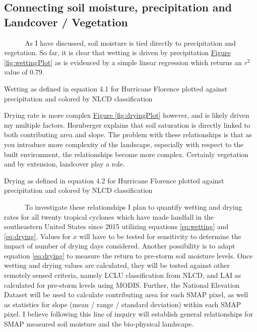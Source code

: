 \documentclass[
]{book}
\begin{document}
\hypertarget{connecting-soil-moisture-precipitation-and-landcover-vegetation}{%
\subsection{Connecting soil moisture, precipitation and Landcover / Vegetation}\label{connecting-soil-moisture-precipitation-and-landcover-vegetation}}

~~~~~~As I have discussed, soil moisture is tied directly to precipitation and vegetation. So far, it is clear that wetting is driven by precipitation \protect\hyperlink{fig:wettingPlot}{Figure \ref{fig:wettingPlot}} as is evidenced by a simple linear regression which returns an \(r^{2}\) value of \(0.79\).

\hypertarget{htmlwidget-0609c5654294221d022d}{}

\label{fig:wettingPlot}Wetting as defined in equation 4.1 for Hurricane Florence plotted against precipitation and colored by NLCD classification

Drying rate is more complex \protect\hyperlink{fig:dryingPlot}{Figure \ref{fig:dryingPlot}} however, and is likely driven my multiple factors. Hornberger \citet{hornberger2014elements} explains that soil saturation is directly linked to both contributing area and slope. The problem with these relationships is that as you introduce more complexity of the landscape, especially with respect to the built environment, the relationships become more complex. Certainly vegetation and by extension, landcover play a role.

\hypertarget{htmlwidget-075d1ca88ff62c033aa7}{}

\label{fig:dryingPlot}Drying as defined in equation 4.2 for Hurricane Florence plotted against precipitation and colored by NLCD classification

~~~~~~To investigate these relationships I plan to quantify wetting and drying rates for all twenty tropical cyclones which have made landfall in the southeastern United States since 2015 utilizing equations \eqref{eq:wetting} and \eqref{eq:drying}. Values for \(x\) will have to be tested for sensitivity to determine the impact of number of drying days considered. Another possibility is to adapt equation \eqref{eq:drying} to measure the return to pre-storm soil moisture levels. Once wetting and drying values are calculated, they will be tested against other remotely sensed criteria, namely LCLU classification from NLCD, and LAI as calculated for pre-storm levels using MODIS. Further, the National Elevation Dataset will be used to calculate contributing area for each SMAP pixel, as well as statistics for slope (mean / range / standard deviation) within each SMAP pixel. I believe following this line of inquiry will establish general relationships for SMAP measured soil moisture and the bio-physical landscape.
\end{document}
